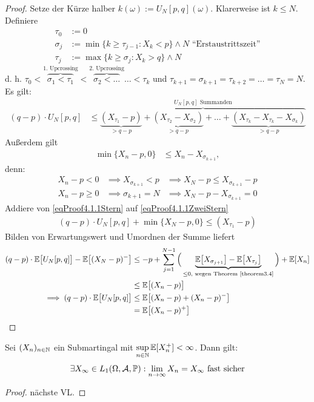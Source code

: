 \begin{proof}
Setze der Kürze halber $k(\omega):=U_N[p,q](\omega)$. Klarerweise ist $k\leq N$. Definiere
\begin{align*}
\tau_0&:=0\\
\sigma_j&:=\min\big\lbrace k\geq \tau_{j-1}:X_k<p\big\rbrace\wedge N\text{ ``Erstaustrittszeit''}\\
\tau_j&:=\max\big\lbrace k\geq\sigma_j:X_k>q\big\rbrace\wedge N
\end{align*}
d. h. $\tau_0<\overbrace{\sigma_1<\tau_1}^{\text{1. Upcrossing}}<\overbrace{\sigma_2<\ldots}^{\text{2. Upcrossing}}\ldots<\tau_k$ und $\tau_{k+1}=\sigma_{k+1}=\tau_{k+2}=\ldots=\tau_N=N$. Es gilt:
\begin{align}\label{eqProof4.1.1Stern}\tag{$\ast$}
(q-p)\cdot U_N[p,q] &\leq
\overbrace{\underbrace{(X_{\tau_1}-p)}_{>q-p}+\underbrace{(X_{\tau_2}-X_{\sigma_2})}_{>q-p}+\ldots+\underbrace{(X_{\tau_k}-X_{\tau_k}-X_{\sigma_k})}_{>q-p}}^{U_N[p,q]\text{ Summanden}}
\end{align}
Außerdem gilt
\begin{align}\label{eqProof4.1.1ZweiStern}\tag{$\ast\ast$}
\min\lbrace X_n-p,0\rbrace&\leq X_n-X_{\sigma_{k+1}},
\end{align}
denn: 
\begin{align*}
X_n-p<0&\implies X_{\sigma_{k+1}}<p&\implies X_N-p\leq X_{\sigma_{k+1}}-p\\
X_n-p\geq0&\implies \sigma_{k+1}=N&\implies X_N-p- X_{\sigma_{k+1}}=0
\end{align*}
Addiere von \eqref{eqProof4.1.1Stern} auf \eqref{eqProof4.1.1ZweiStern}
\begin{align*}
(q-p)\cdot U_N[p,q]+\min\lbrace X_N-p,0\rbrace\leq (X_{\tau_1}-p)
\end{align*}
Bilden von Erwartungswert und Umordnen der Summe liefert
\begin{align*}
(q-p)\cdot\mathbb{E}\big[U_N[p,q]\big]-\mathbb{E}\big[(X_N-p)^-\big]
&\leq-p+\sum\limits_{j=1}^{N-1}\Big(\underbrace{\mathbb{E}\big[X_{\sigma_{j+1}}\big]-\mathbb{E}\big[X_{\tau_j}\big]}_{\leq 0\text{, wegen Theorem \ref{theorem3.4}}}\Big)+\mathbb{E}[X_n]\\
&\leq\mathbb{E}\big[(X_n-p)\big]\\
\implies
(q-p)\cdot\mathbb{E}\big[U_N[p,q]\big]&\leq\mathbb{E}\big[(X_n-p)+(X_n-p)^-\big]\\
&=\mathbb{E}\big[(X_n-p)^+\big]
\end{align*}
\end{proof}

\begin{theorem}[Martingalkonvergenz]\label{theorem4.2Martingalkonvergenz}\enter
Sei $(X_n)_{n\in\mathbb{N}}$ ein Submartingal mit $\sup\limits_{n\in\mathbb{N}}\mathbb{E}[X_n^+]<\infty$. Dann gilt:
\begin{align*}
\exists X_\infty\in L_1(\Omega,\mathcal{A},\mathbb{P}):\lim\limits_{n\to\infty} X_n=X_\infty\text{ fast sicher}
\end{align*}
\end{theorem}
\begin{proof}
nächste VL.
\end{proof}






